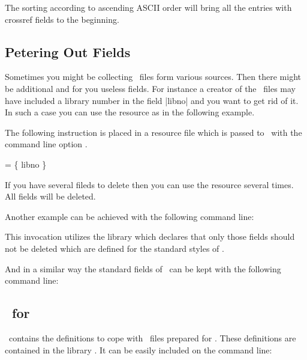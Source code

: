 \documentclass[11pt,a4paper]{scrbook}
\begin{document}
The sorting according to ascending ASCII order will bring all the entries with
crossref fields to the beginning.


\subsection{Petering Out Fields}

Sometimes you might be collecting \BibTeX\ files form various sources. Then
there might be additional and for you useless fields. For instance a creator
of the \BibTeX\ files may have included a library number in the field |libno|
and you want to get rid of it. In such a case you can use the resource
 as in the following example.

The following instruction is placed in a resource file which is passed to
\BibTool\ with the command line option .

\begin{Resources}
   = \{ libno \}
\end{Resources}

If you have several fileds to delete then you can use the resource
 several times. All fields will be deleted.

Another example can be achieved with the following command line:


This invocation utilizes the library  which declares
that only those fields should not be deleted which are defined for the
standard styles of \BibTeX.

And in a similar way the standard fields of \bibLaTeX\ can be kept with the
following command line:



\subsection{\BibTool\ for \bibLaTeX}

\BibTool\ contains the definitions to cope with \BibTeX\ files prepared for
\bibLaTeX. These definitions are contained in the library .
It can be easily included on the command line:

\end{document}
